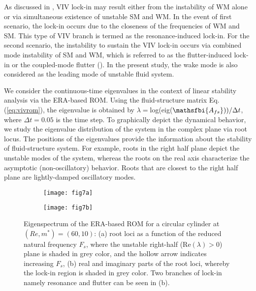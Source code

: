 \documentclass{jfm}
\begin{document}
%
As discussed in \cite{Zhang2015}, VIV lock-in may result either from the instability 
of WM alone or via simultaneous existence of unstable SM and WM. 
In the event of first scenario, the lock-in occurs due to the closeness of 
the frequencies of WM and SM.
This type of VIV branch is termed as the resonance-induced lock-in.
For the second scenario, the instability to sustain the VIV lock-in occurs via 
combined mode instability of SM and WM, which is referred to as 
the flutter-induced lock-in or the coupled-mode flutter (\cite{DeLangre2006}). 
%
In the present study, 
the wake mode is also considered as the leading mode of unstable fluid system. 

We consider the continuous-time eigenvalues in the context of 
linear stability analysis via the ERA-based ROM. 
Using the fluid-structure matrix Eq. (\ref{eq:vivrom}), the eigenvalue 
is obtained by $\lambda=$log(eig($\mathsfbi{A_{fs}}))/\Delta t$,
where $\Delta t=0.05$ is the time step.
%
To graphically depict the dynamical behavior, we study the eigenvalue distribution of the system 
in the complex plane via root locus. The positions of the eigenvalues provide 
the information about the stability of fluid-structure system. For example, roots in the right 
half plane depict the unstable modes of the system, whereas the roots on the real 
axis characterize the asymptotic (non-oscillatory) behavior. Roots that are closest 
to the right half plane are lightly-damped oscillatory modes.

\begin{figure}
\centering
\begin{subfigure}{0.495\textwidth}
\centering
	 \texttt{[image: fig7a]}
    \caption{}
    \label{fig:m10_re60_eig1}
    \end{subfigure} 
\begin{subfigure}{0.495\textwidth} 
\centering
     \texttt{[image: fig7b]}
	\caption{}
	\label{fig:m10_re60_eig23}
	\end{subfigure}	
     \caption{Eigenspectrum of the ERA-based ROM for a circular cylinder at $(Re,m^*)=(60,10)$: 
     (a) root loci as a function of the reduced natural frequency $F_s$, 
     where the unstable right-half (Re$(\lambda) > 0$) plane is shaded in grey color,
     and the hollow arrow indicates increasing $F_s$, 
     (b) real and imaginary parts of the root loci, whereby the lock-in region 
     is shaded in grey color. Two branches of lock-in namely resonance and flutter can 
     be seen in (b).
     }
\label{fig:m10_eig}
\end{figure}
\end{document}
